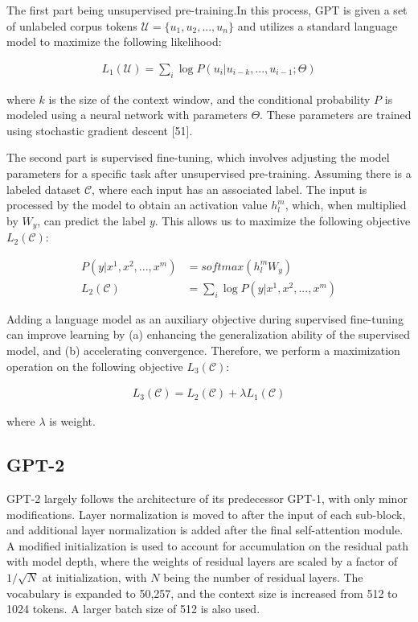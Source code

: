\documentclass[conference]{IEEEtran}
\begin{document}
\par The first part being unsupervised pre-training.In this process, GPT is given a 
set of unlabeled corpus tokens $\mathcal{U} = \{u_1, u_2, ..., u_n \}$ and utilizes a standard language model to maximize 
the following likelihood:

\begin{align*}
    L_1(\mathcal{U}) = \sum_{i}\log P(u_i | u_{i-k}, ..., u_{i-1};\Theta )
\end{align*}

\par where $k$ is the size of the context window, and the conditional probability $P$ is 
modeled using a neural network with parameters $\Theta$. These parameters are trained 
using stochastic gradient descent [51].

The second part is supervised fine-tuning, which involves adjusting the model parameters 
for a specific task after unsupervised pre-training. Assuming there is a labeled 
dataset $\mathcal{C} $, where each input has an associated label. The input is processed by the 
model to obtain an activation value $h^m_l$, which, when multiplied by $W_y$, can predict the 
label $y$. This allows us to maximize the following objective $L_2(\mathcal{C})$:

\begin{align*}
    P(y | x^1, x^2, ..., x^m) &= softmax(h_l^m W_y) \\
    L_2(\mathcal{C}) &= \sum_{i}\log P(y | x^1, x^2, ..., x^m)
\end{align*}

Adding a language model as an auxiliary objective during supervised fine-tuning 
can improve learning by (a) enhancing the generalization ability of the supervised 
model, and (b) accelerating convergence. Therefore, we perform a maximization operation 
on the following objective $L_3(\mathcal{C})$:

\begin{align*}
    L_3(\mathcal{C}) = L_2(\mathcal{C}) + \lambda L_1(\mathcal{C})
\end{align*}

\par where $\lambda$ is weight.

\subsection{GPT-2}

\par GPT-2 largely follows the architecture of its predecessor GPT-1, 
with only minor modifications. Layer normalization is moved to after the input 
of each sub-block, and additional layer normalization is added after the final 
self-attention module. A modified initialization is used to account for accumulation 
on the residual path with model depth, where the weights of residual layers are scaled 
by a factor of $1/\sqrt{N}$ at initialization, with $N$ being the number of residual layers. 
The vocabulary is expanded to 50,257, and the context size is increased from 512 to 
1024 tokens. A larger batch size of 512 is also used.
\end{document}
